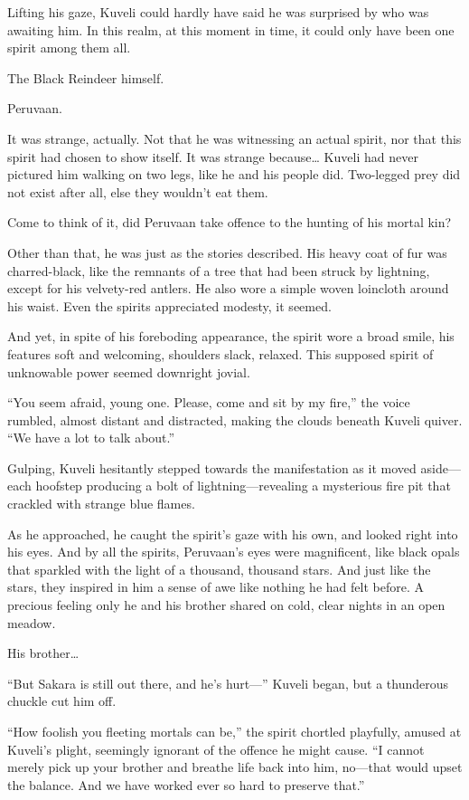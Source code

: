 Lifting his gaze, Kuveli could hardly have said he was surprised by who was awaiting him. In this realm, at this moment in time, it could only have been one spirit among them all.

The Black Reindeer himself.

Peruvaan.

It was strange, actually. Not that he was witnessing an actual spirit, nor that this spirit had chosen to show itself. It was strange because\ldots{} Kuveli had never pictured him walking on two legs, like he and his people did. Two-legged prey did not exist after all, else they wouldn't eat them.

Come to think of it, did Peruvaan take offence to the hunting of his mortal kin?

Other than that, he was just as the stories described. His heavy coat of fur was charred-black, like the remnants of a tree that had been struck by lightning, except for his velvety-red antlers. He also wore a simple woven loincloth around his waist. Even the spirits appreciated modesty, it seemed.

And yet, in spite of his foreboding appearance, the spirit wore a broad smile, his features soft and welcoming, shoulders slack, relaxed. This supposed spirit of unknowable power seemed downright jovial.

``You seem afraid, young one. Please, come and sit by my fire,'' the voice rumbled, almost distant and distracted, making the clouds beneath Kuveli quiver. ``We have a lot to talk about.''

Gulping, Kuveli hesitantly stepped towards the manifestation as it moved aside---each hoofstep producing a bolt of lightning---revealing a mysterious fire pit that crackled with strange blue flames.

As he approached, he caught the spirit's gaze with his own, and looked right into his eyes. And by all the spirits, Peruvaan's eyes were magnificent, like black opals that sparkled with the light of a thousand, thousand stars. And just like the stars, they inspired in him a sense of awe like nothing he had felt before. A precious feeling only he and his brother shared on cold, clear nights in an open meadow.

His brother\ldots{}

``But Sakara is still out there, and he's hurt---'' Kuveli began, but a thunderous chuckle cut him off.

``How foolish you fleeting mortals can be,'' the spirit chortled playfully, amused at Kuveli's plight, seemingly ignorant of the offence he might cause. ``I cannot merely pick up your brother and breathe life back into him, no---that would upset the balance. And we have worked ever so hard to preserve that.''

